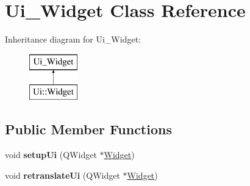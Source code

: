\hypertarget{class_ui___widget}{}\section{Ui\+\_\+\+Widget Class Reference}
\label{class_ui___widget}
Inheritance diagram for Ui\+\_\+\+Widget\+:\begin{figure}[H]
\begin{center}
\leavevmode
\includegraphics[height=2.000000cm]{class_ui___widget}
\end{center}
\end{figure}
\subsection*{Public Member Functions}
\begin{DoxyCompactItemize}
\item 
\mbox{\label{class_ui___widget_a9039ed8704971418cbe19ef8c9eea266}} 
void {\bfseries setup\+Ui} (Q\+Widget $\ast$\mbox{\hyperlink{class_widget}{Widget}})
\item 
\mbox{\label{class_ui___widget_ae1cb85db8d3658df8dcd104361edcecb}} 
void {\bfseries retranslate\+Ui} (Q\+Widget $\ast$\mbox{\hyperlink{class_widget}{Widget}})
\end{DoxyCompactItemize}
